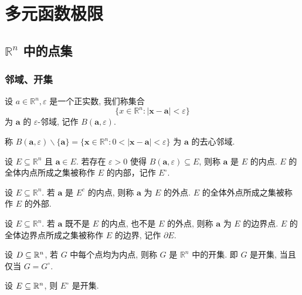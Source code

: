 \chapter{多元函数极限}

\section{$\mathbb{R}^n$ 中的点集}
\subsection{邻域、开集}
\begin{definition}
	设 $a \in \mathbb{R}^n,\varepsilon$ 是一个正实数, 我们称集合 $$\{ x\in\mathbb R^n:|\bm x - \bm a|<\varepsilon\}$$
	为 $\bm a$ 的 $\varepsilon$-邻域, 记作 $B(\bm a,\varepsilon)$.

	称 $B(\bm a,\varepsilon)\backslash \{\bm a\} = \{\bm x \in \mathbb R^n : 0 < |\bm x- \bm a|< \varepsilon\}$ 为 $\bm a$ 的去心邻域.
\end{definition}


\begin{definition}[内点、内部]
	设 $E\subseteq \mathbb R^n$ 且 $\bm a \in E$. 若存在 $\varepsilon>0$ 使得 $B(\bm a,\varepsilon) \subseteq E$, 则称 $\bm a$ 是 $E$ 的内点. $E$ 的全体内点所成之集被称作 $E$ 的内部，记作 $E^\circ$.
\end{definition}

\begin{definition}[外点、外部]
	设 $E \subseteq \mathbb R^n$. 若 $\bm a$ 是 $E^c$ 的内点, 则称 $\bm a$ 为 $E$ 的外点. $E$ 的全体外点所成之集被称作 $E$ 的外部.
\end{definition}

\begin{definition}[边界点、边界]
	设 $E \subseteq \mathbb R^n$. 若 $\bm a$ 既不是 $E$ 的内点, 也不是 $E$ 的外点, 则称 $\bm a$ 为 $E$ 的边界点. $E$ 的全体边界点所成之集被称作 $E$ 的边界, 记作 $\partial E$.
\end{definition}

\begin{definition}[开集]
	设 $D \subseteq \mathbb {R}^{n}$, 若 $G$ 中每个点均为内点, 则称 $G$ 是 $\mathbb R^n$ 中的开集. 即 $G$ 是开集, 当且仅当 $G=G^\circ$.
\end{definition}

\begin{proposition}
	设 $E \subseteq \mathbb {R}^{n}$, 则 $E^\circ$ 是开集.
\end{proposition}

